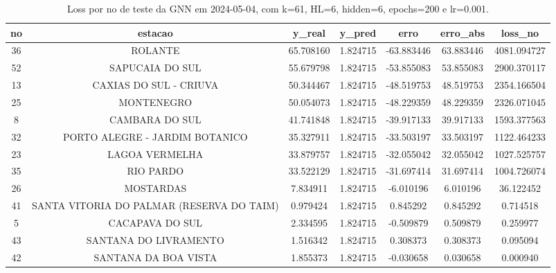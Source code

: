 \begin{table}[h]
\centering
\caption{Loss por no de teste da GNN em 2024-05-04, com k=61, HL=6, hidden=6, epochs=200 e lr=0.001.}
\label{tab:gnn_loss_k61_hl6_h6_e200_d20240504}
\begin{tabular}{ccccccc}
\toprule
no & estacao & y\_real & y\_pred & erro & erro\_abs & loss\_no \\
\midrule
36 & ROLANTE & 65.708160 & 1.824715 & -63.883446 & 63.883446 & 4081.094727 \\
52 & SAPUCAIA DO SUL & 55.679798 & 1.824715 & -53.855083 & 53.855083 & 2900.370117 \\
13 & CAXIAS DO SUL - CRIUVA & 50.344467 & 1.824715 & -48.519753 & 48.519753 & 2354.166504 \\
25 & MONTENEGRO & 50.054073 & 1.824715 & -48.229359 & 48.229359 & 2326.071045 \\
8 & CAMBARA DO SUL & 41.741848 & 1.824715 & -39.917133 & 39.917133 & 1593.377563 \\
32 & PORTO ALEGRE - JARDIM BOTANICO & 35.327911 & 1.824715 & -33.503197 & 33.503197 & 1122.464233 \\
23 & LAGOA VERMELHA & 33.879757 & 1.824715 & -32.055042 & 32.055042 & 1027.525757 \\
35 & RIO PARDO & 33.522129 & 1.824715 & -31.697414 & 31.697414 & 1004.726074 \\
26 & MOSTARDAS & 7.834911 & 1.824715 & -6.010196 & 6.010196 & 36.122452 \\
41 & SANTA VITORIA DO PALMAR (RESERVA DO TAIM) & 0.979424 & 1.824715 & 0.845292 & 0.845292 & 0.714518 \\
5 & CACAPAVA DO SUL & 2.334595 & 1.824715 & -0.509879 & 0.509879 & 0.259977 \\
43 & SANTANA DO LIVRAMENTO & 1.516342 & 1.824715 & 0.308373 & 0.308373 & 0.095094 \\
42 & SANTANA DA BOA VISTA & 1.855373 & 1.824715 & -0.030658 & 0.030658 & 0.000940 \\
\bottomrule
\end{tabular}
\end{table}
